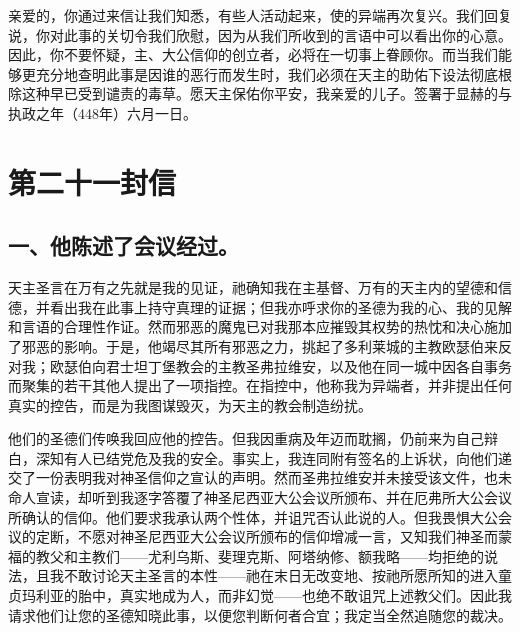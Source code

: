亲爱的，你通过来信让我们知悉，有些人活动起来，使的异端再次复兴。我们回复说，你对此事的关切令我们欣慰，因为从我们所收到的言语中可以看出你的心意。因此，你不要怀疑，主、大公信仰的创立者，必将在一切事上眷顾你。而当我们能够更充分地查明此事是因谁的恶行而发生时，我们必须在天主的助佑下设法彻底根除这种早已受到谴责的毒草。愿天主保佑你平安，我亲爱的儿子。签署于显赫的与执政之年（448年）六月一日。\par



\section{第二十一封信}

\par


\subsection{一、他陈述了会议经过。}

天主圣言在万有之先就是我的见证，祂确知我在主基督、万有的天主内的望德和信德，并看出我在此事上持守真理的证据；但我亦呼求你的圣德为我的心、我的见解和言语的合理性作证。然而邪恶的魔鬼已对我那本应摧毁其权势的热忱和决心施加了邪恶的影响。于是，他竭尽其所有邪恶之力，挑起了多利莱城的主教欧瑟伯来反对我；欧瑟伯向君士坦丁堡教会的主教圣弗拉维安，以及他在同一城中因各自事务而聚集的若干其他人提出了一项指控。在指控中，他称我为异端者，并非提出任何真实的控告，而是为我图谋毁灭，为天主的教会制造纷扰。\par

他们的圣德们传唤我回应他的控告。但我因重病及年迈而耽搁，仍前来为自己辩白，深知有人已结党危及我的安全。事实上，我连同附有签名的上诉状，向他们递交了一份表明我对神圣信仰之宣认的声明。然而圣弗拉维安并未接受该文件，也未命人宣读，却听到我逐字答覆了神圣尼西亚大公会议所颁布、并在厄弗所大公会议所确认的信仰。他们要求我承认两个性体，并诅咒否认此说的人。但我畏惧大公会议的定断，不愿对神圣尼西亚大公会议所颁布的信仰增减一言，又知我们神圣而蒙福的教父和主教们——尤利乌斯、斐理克斯、阿塔纳修、额我略——均拒绝的说法，且我不敢讨论天主圣言的本性——祂在末日无改变地、按祂所愿所知的进入童贞玛利亚的胎中，真实地成为人，而非幻觉——也绝不敢诅咒上述教父们。因此我请求他们让您的圣德知晓此事，以便您判断何者合宜；我定当全然追随您的裁决。\par

